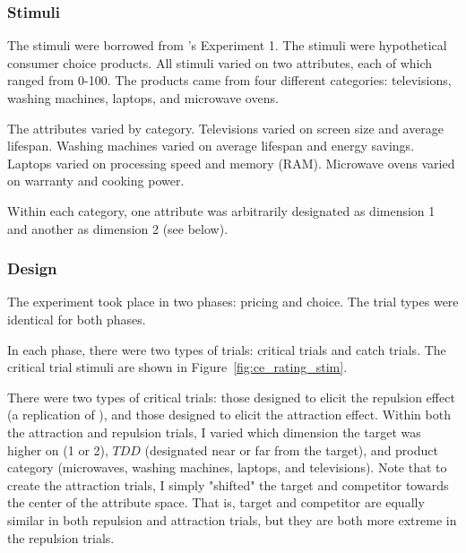 \subsubsection{Stimuli}

The stimuli were borrowed from \textcite{banerjeeFactorsThatPromote2024}'s Experiment 1. The stimuli were hypothetical consumer choice products. All stimuli varied on two attributes, each of which ranged from 0-100. The products came from four different categories: televisions, washing machines, laptops, and microwave ovens. 

The attributes varied by category. Televisions varied on screen size and average lifespan. Washing machines varied on average lifespan and energy savings. Laptops varied on processing speed and memory (RAM). Microwave ovens varied on warranty and cooking power. 

Within each category, one attribute was arbitrarily designated as dimension 1 and another as dimension 2 (see below). 

\subsubsection{Design}

The experiment took place in two phases: pricing and choice. The trial types were identical for both phases.

In each phase, there were two types of trials: critical trials and catch trials. The critical trial stimuli are shown in Figure~\ref{fig:ce_rating_stim}. 

There were two types of critical trials: those designed to elicit the repulsion effect (a replication of \citeauthor{banerjeeFactorsThatPromote2024}), and those designed to elicit the attraction effect. Within both the attraction and repulsion trials, I varied which dimension the target was higher on (1 or 2), $TDD$ (designated near or far from the target), and product category (microwaves, washing machines, laptops, and televisions). Note that to create the attraction trials, I simply "shifted" the target and competitor towards the center of the attribute space. That is, target and competitor are equally similar in both repulsion and attraction trials, but they are both more extreme in the repulsion trials.

